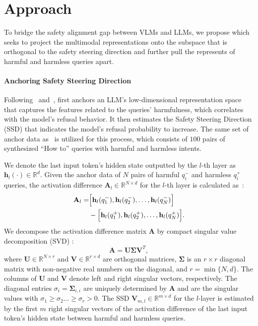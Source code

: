 \section{Approach}
\label{method}

To bridge the safety alignment gap between VLMs and LLMs, we propose \MODEL which seeks to project the multimodal representations onto the subspace that is orthogonal to the safety steering direction and further pull the represents of harmful and harmless queries apart.

\paragraph{Anchoring Safety Steering Direction}

Following~\citet{wang2024inferaligner} and~\citet{zheng2024prompt}, \MODEL first anchors an LLM's low-dimensional representation space that captures the features related to the queries’ harmfulness, which correlates with the model’s refusal behavior. It then estimates the Safety Steering Direction (SSD) that indicates the model’s refusal probability to increase.
The same set of anchor data as~\citet{zheng2024prompt} is utilized for this process, which consists of $100$ pairs of synthesized ``How to'' queries with harmful and harmless intents.

We denote the last input token’s hidden state outputted by the $l$-th layer as $\mathbf{h}_l(\cdot) \in \mathbb{R}^d$. Given the anchor data of $N$ pairs of harmful $q_i^-$ and harmless $q_i^+$ queries, the activation difference $\mathbf{A}_l \in \mathbb{R}^{N \times d}$ for the $l$-th layer is calculated as~\cite{wang2024inferaligner}:
\begin{align*}
    \mathbf{A}_l = &\Big{[}\mathbf{h}_l(q_1^-), \mathbf{h}_l(q_2^-), \dots, \mathbf{h}_l(q_N^-)\Big{]} \\
    &- \Big{[}\mathbf{h}_l(q_1^+),\mathbf{h}_l(q_2^+), \dots, \mathbf{h}_l(q_N^+)\Big{]}.
\end{align*}
We decompose the activation difference matrix $\mathbf{A}$ by compact singular value decomposition (SVD) \cite{horn2012matrix}:
\begin{equation}
 	\mathbf{A}= \mathbf{U} \mathbf{\Sigma} \mathbf{V}^T,
\end{equation}
where $\mathbf{U} \in \mathbb{R}^{N \times r}$ and $\mathbf{V} \in \mathbb{R}^{r \times d}$ are orthogonal matrices, $\mathbf{\Sigma}$ is an $r \times r$ diagonal matrix with non-negative real numbers on the diagonal, and $r=\min\{N, d\}$. 
The columns of $\mathbf{U}$ and $\mathbf{V}$ denote left and right singular vectors, respectively.
The diagonal entries $\sigma_i=\mathbf{\Sigma}_{i,i}$ are uniquely determined by $\mathbf{A}$ and are the singular values with $\sigma_1 \geq \sigma_2 \ldots \geq \sigma_r > 0$.
The SSD $\mathbf{V}_{m, l} \in \mathbb{R}^{m \times d}$ for the $l$-layer is estimated by the first $m$ right singular vectors of the activation difference of the last input token's hidden state between harmful and harmless queries. 
 
